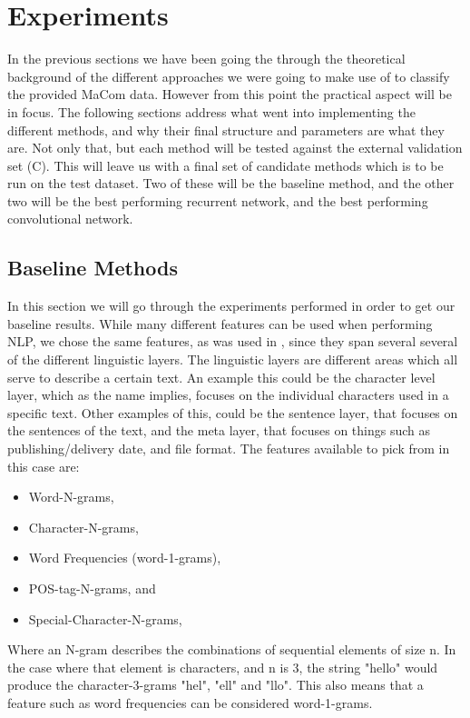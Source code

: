 \section{Experiments} \label{sec:experiments}

In the previous sections we have been going the through the theoretical
background of the different approaches we were going to make use of to classify
the provided MaCom data. However from this point the practical aspect will be in
focus. The following sections address what went into implementing the different
methods, and why their final structure and parameters are what they are. Not
only that, but each method will be tested against the external validation set
(C). This will leave us with a final set of candidate methods which is to be run
on the test dataset. Two of these will be the baseline method, and the other
two will be the best performing recurrent network, and the best performing
convolutional network.


\subsection{Baseline Methods} \label{subsec:baseline}

In this section we will go through the experiments performed in order to get
our baseline results. While many different features can be used when performing
\gls{NLP}, we chose the same features, as was used in \citet{US}, since they
span several several of the different linguistic layers. The linguistic layers
are different areas which all serve to describe a certain text. An example this
could be the character level layer, which as the name implies, focuses on the
individual characters used in a specific text. Other examples of this, could
be the sentence layer, that focuses on the sentences of the text, and the meta
layer, that focuses on things such as publishing/delivery date, and file format.
The features available to pick from in this case are:

\begin{itemize}
    \item Word-N-grams,
    \item Character-N-grams,
    \item Word Frequencies (word-1-grams),
    \item \gls{POS}-tag-N-grams, and
    \item Special-Character-N-grams,
\end{itemize}

Where an N-gram describes the combinations of sequential elements of size n. In
the case where that element is characters, and n is 3, the string "hello" would
produce the character-3-grams "hel", "ell" and "llo". This also means that a
feature such as word frequencies can be considered word-1-grams.


